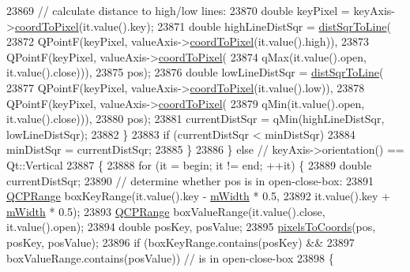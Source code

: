 \begin{DoxyCode}
23869         \textcolor{comment}{// calculate distance to high/low lines:}
23870         \textcolor{keywordtype}{double} keyPixel = keyAxis->\hyperlink{class_q_c_p_axis_a985ae693b842fb0422b4390fe36d299a}{coordToPixel}(it.value().key);
23871         \textcolor{keywordtype}{double} highLineDistSqr = \hyperlink{class_q_c_p_abstract_plottable_a5ea1cab44ca912dcdc96ed81ec5bed5d}{distSqrToLine}(
23872             QPointF(keyPixel, valueAxis->\hyperlink{class_q_c_p_axis_a985ae693b842fb0422b4390fe36d299a}{coordToPixel}(it.value().high)),
23873             QPointF(keyPixel, valueAxis->\hyperlink{class_q_c_p_axis_a985ae693b842fb0422b4390fe36d299a}{coordToPixel}(
23874                                   qMax(it.value().open, it.value().close))),
23875             pos);
23876         \textcolor{keywordtype}{double} lowLineDistSqr = \hyperlink{class_q_c_p_abstract_plottable_a5ea1cab44ca912dcdc96ed81ec5bed5d}{distSqrToLine}(
23877             QPointF(keyPixel, valueAxis->\hyperlink{class_q_c_p_axis_a985ae693b842fb0422b4390fe36d299a}{coordToPixel}(it.value().low)),
23878             QPointF(keyPixel, valueAxis->\hyperlink{class_q_c_p_axis_a985ae693b842fb0422b4390fe36d299a}{coordToPixel}(
23879                                   qMin(it.value().open, it.value().close))),
23880             pos);
23881         currentDistSqr = qMin(highLineDistSqr, lowLineDistSqr);
23882       \}
23883       \textcolor{keywordflow}{if} (currentDistSqr < minDistSqr)
23884         minDistSqr = currentDistSqr;
23885     \}
23886   \} \textcolor{keywordflow}{else} \textcolor{comment}{// keyAxis->orientation() == Qt::Vertical}
23887   \{
23888     \textcolor{keywordflow}{for} (it = begin; it != end; ++it) \{
23889       \textcolor{keywordtype}{double} currentDistSqr;
23890       \textcolor{comment}{// determine whether pos is in open-close-box:}
23891       \hyperlink{class_q_c_p_range}{QCPRange} boxKeyRange(it.value().key - \hyperlink{class_q_c_p_financial_af630e5eb8485146b9c777e63fd1cf993}{mWidth} * 0.5,
23892                            it.value().key + \hyperlink{class_q_c_p_financial_af630e5eb8485146b9c777e63fd1cf993}{mWidth} * 0.5);
23893       \hyperlink{class_q_c_p_range}{QCPRange} boxValueRange(it.value().close, it.value().open);
23894       \textcolor{keywordtype}{double} posKey, posValue;
23895       \hyperlink{class_q_c_p_abstract_plottable_a10408828446e9e0681c46d65120f382e}{pixelsToCoords}(pos, posKey, posValue);
23896       \textcolor{keywordflow}{if} (boxKeyRange.contains(posKey) &&
23897           boxValueRange.contains(posValue)) \textcolor{comment}{// is in open-close-box}
23898       \{

\end{DoxyCode}
